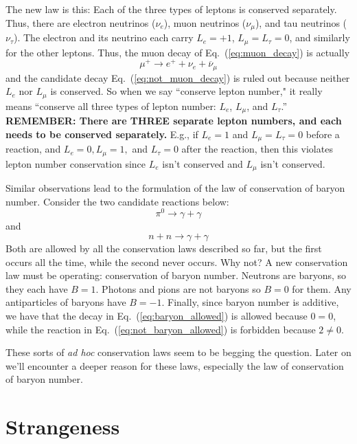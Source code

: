 The new law is this:  Each of the three types of leptons is conserved
separately.  Thus, there are electron neutrinos ($\nu_e$), muon
neutrinos ($\nu_\mu$), and tau neutrinos ($\nu_\tau$).  The electron
and its neutrino each carry $L_e = +1$, $L_\mu = L_\tau = 0$, and
similarly for the other leptons.  Thus, the muon decay of
Eq.~(\ref{eq:muon_decay}) is actually
\begin{equation}
\mu^+ \to e^+ + \nu_e + \overline\nu_\mu
\end{equation}
and the candidate decay Eq.~(\ref{eq:not_muon_decay}) is ruled out
because neither $L_e$ nor $L_\mu$ is conserved.
So when we say ``conserve lepton number," it really means
``conserve all three types of lepton number:  $L_e$, $L_\mu$, and 
$L_\tau$.'' {\bf REMEMBER: There are THREE separate lepton numbers, and 
each needs to be conserved separately.} E.g., if $L_e = 1$ and $L_\mu =
L_\tau = 0$ before a reaction, and $L_e = 0, L_\mu = 1,$ and $L_\tau = 0$ after
the reaction, then this violates lepton number conservation since $L_e$ isn't
conserved and $L_\mu$ isn't conserved.

Similar observations lead to the formulation of the law of
conservation of baryon number.  Consider the two candidate reactions
below:
\begin{equation}
\pi^0 \to \gamma + \gamma
\label{eq:baryon_allowed}
\end{equation}
and
\begin{equation}
n + n \to \gamma + \gamma
\label{eq:not_baryon_allowed}
\end{equation}
Both are allowed by all the conservation laws described so far, but
the first occurs all the time, while the second never occurs.  Why
not?  A new conservation law must be operating: conservation of baryon
number.  Neutrons are baryons, so they each have $B = 1$.  Photons and
pions are not baryons so $B = 0$ for them.  Any antiparticles of
baryons have $B = -1$.  Finally, since baryon number is additive, we
have that the decay in Eq.~(\ref{eq:baryon_allowed}) is allowed
because $0=0$, while the reaction in Eq.~(\ref{eq:not_baryon_allowed})
is forbidden because $2 \neq 0$.

These sorts of {\em ad hoc} conservation laws seem to be begging the
question.  Later on we'll encounter a deeper reason for these laws,
especially the law of conservation of baryon number.


\section{Strangeness}

